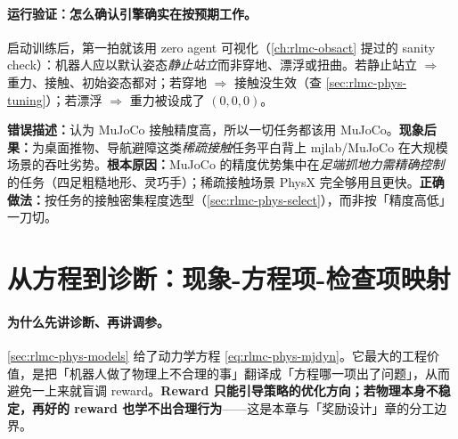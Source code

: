 \paragraph{运行验证：怎么确认引擎确实在按预期工作。}启动训练后，第一拍就该用 zero agent 可视化（\cref{ch:rlmc-obsact} 提过的 sanity check）：机器人应以默认姿态\emph{静止站立}而非穿地、漂浮或扭曲。若静止站立 $\Rightarrow$ 重力、接触、初始姿态都对；若穿地 $\Rightarrow$ 接触没生效（查 \cref{sec:rlmc-phys-tuning}）；若漂浮 $\Rightarrow$ 重力被设成了 $(0,0,0)$。

\begin{pitfall}
\textbf{错误描述：}认为 MuJoCo 接触精度高，所以一切任务都该用 MuJoCo。\textbf{现象后果：}为桌面推物、导航避障这类\emph{稀疏接触}任务平白背上 mjlab/MuJoCo 在大规模场景的吞吐劣势。\textbf{根本原因：}MuJoCo 的精度优势集中在\emph{足端抓地力需精确控制}的任务（四足粗糙地形、灵巧手）；稀疏接触场景 PhysX 完全够用且更快。\textbf{正确做法：}按任务的接触密集程度选型（\cref{sec:rlmc-phys-select}），而非按「精度高低」一刀切。
\end{pitfall}

\begin{practice}[本节练习]
\end{practice}

\section{从方程到诊断：现象-方程项-检查项映射}
\label{sec:rlmc-phys-diag}

\paragraph{为什么先讲诊断、再讲调参。}\cref{sec:rlmc-phys-models} 给了动力学方程 \eqref{eq:rlmc-phys-mjdyn}。它最大的工程价值，是把「机器人做了物理上不合理的事」翻译成「方程哪一项出了问题」，从而避免一上来就盲调 reward。\textbf{Reward 只能引导策略的优化方向；若物理本身不稳定，再好的 reward 也学不出合理行为}——这是本章与「奖励设计」章的分工边界。

